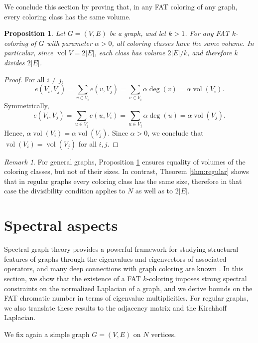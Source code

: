 \documentclass{article}
\DeclareMathOperator{\vol}{vol}
\theoremstyle{plain}
\newtheorem{proposition}[theorem]{Proposition}
\theoremstyle{definition}
\theoremstyle{remark}
\newtheorem{remark}[theorem]{Remark}
\begin{document}
We conclude this section by proving that, in any FAT coloring of any graph, every coloring class has the same volume.
 
 
\begin{proposition}\label{prop:vol}
 Let $G=(V,E)$ be a graph, and let $k>1$. For any FAT $k$-coloring of $G$ with parameter $\alpha>0$, all coloring classes have the same volume. In particular, since $\vol V=2|E|$, each class has volume $2|E|/k$, and therefore $k$ divides $2|E|$.
\end{proposition}


\begin{proof}
For all $i\neq j$,
$$
e(V_i,V_j)=\sum_{v\in V_i} e(v,V_j)=\sum_{v\in V_i}\alpha\deg(v)=\alpha\vol(V_i).
$$
Symmetrically,
$$
e(V_i,V_j)=\sum_{u\in V_j} e(u,V_i)=\sum_{u\in V_j}\alpha\deg(u)=\alpha\vol(V_j).
$$
Hence, $\alpha\vol(V_i)=\alpha\vol (V_j)$. Since $\alpha>0$, we conclude that $\vol (V_i)=\vol(V_j)$ for all $i, j$.
\end{proof}


\begin{remark}
For general graphs, Proposition \ref{prop:vol} ensures equality of volumes of the coloring classes, but not of their sizes. In contrast, Theorem \ref{thm:regular} shows that in regular graphs every coloring class has the same size, therefore in that case the divisibility condition applies to $N$ as well as to $2|E|$.
\end{remark}


\section{Spectral aspects}\label{section:spectral}


Spectral graph theory provides a powerful framework for studying structural features of graphs through the eigenvalues and eigenvectors of associated operators, and many deep connections with graph coloring are known \cite{ElphickWocjan2015,Nikiforov2007,Gabriel-colouring,SunDas2020,beersmulas2024,Hoffman1970,generalizedHoffman}. In this section, we show that the existence of a FAT $k$-coloring imposes strong spectral constraints on the normalized Laplacian of a graph, and we derive bounds on the FAT chromatic number in terms of eigenvalue multiplicities. For regular graphs, we also translate these results to the adjacency matrix and the Kirchhoff Laplacian. \newline

We fix again a simple graph $G=(V,E)$ on $N$ vertices.
\end{document}
